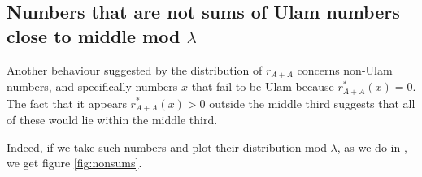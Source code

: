 \documentclass{report}
\theoremstyle{remark}
\numberwithin{equation}{section}
\begin{document}






\subsection{Numbers that are not sums of Ulam numbers close to middle mod $\lambda$}

Another behaviour suggested by the distribution of $r_{A+A}$ concerns
non-Ulam numbers, and specifically numbers $x$ that fail to be Ulam
because $r^*_{A+A}(x) = 0$.  The fact that it appears
$r^*_{A+A}(x) > 0$ outside the middle third suggests that all of these
would lie within the middle third.

Indeed, if we take such numbers and plot their distribution mod
$\lambda$, as we do in , we get figure
\ref{fig:nonsums}.
\end{document}

